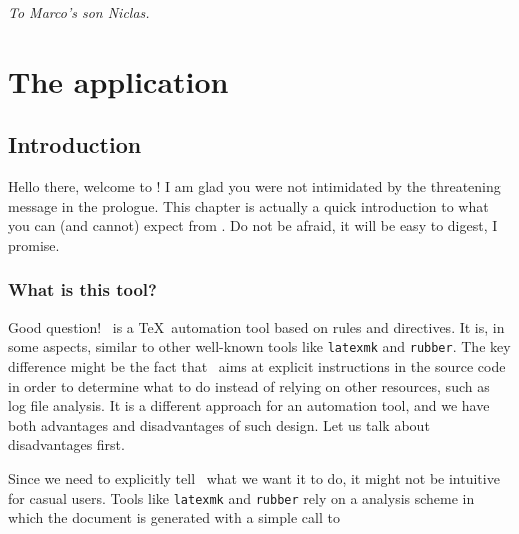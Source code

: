 \documentclass[a4paper,twoside,12pt]{memoir}
\begin{document}
\cleardoublepage

\vspace*{25em}

\begin{flushright}
\em To Marco's son Niclas.
\end{flushright}

\cleardoublepage

\tableofcontents*

\cleardoublepage

\listoffigures*

\cleardoublepage

\listoftables*

\mainmatter

\part{The application}
\label{part:application}

\chapter{Introduction}
\label{chap:introduction}

Hello there, welcome to \arara! I am glad you were not
intimidated by the threatening message in the prologue.
This chapter is actually a quick introduction to what
you can (and cannot) expect from \arara. Do not be
afraid, it will be easy to digest, I promise.

\section{What is this tool?}
\label{sec:whatisarara}

Good question! \arara\ is a \TeX\ automation tool based
on rules and directives. It is, in some aspects, similar
to other well-known tools like \verb|latexmk| and
\verb|rubber|. The key difference might be the fact that
\arara\ aims at explicit instructions in the source code
in order to determine what to do instead of relying on
other resources, such as log file analysis. It is a
different approach for an automation tool, and we have
both advantages and disadvantages of such design.
Let us talk about disadvantages first.

Since we need to explicitly tell \arara\ what we want it
to do, it might not be intuitive for casual users. Tools
like \verb|latexmk| and \verb|rubber| rely on a analysis
scheme in which the document is generated with a simple
call to
\end{document}
